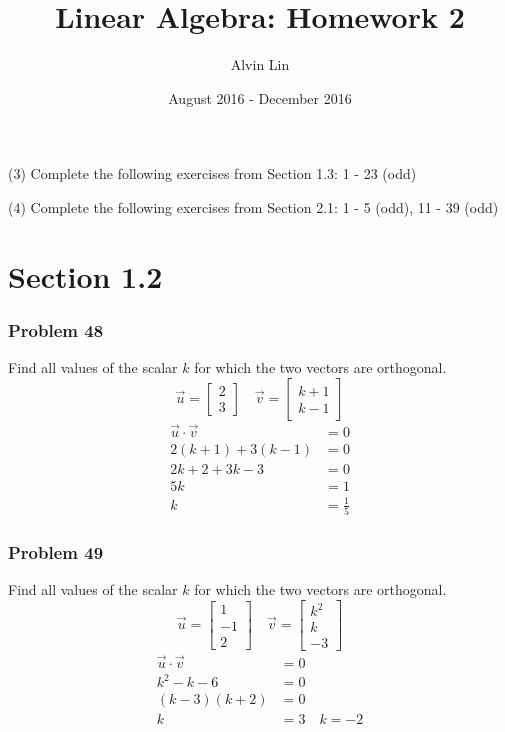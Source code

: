 \documentclass[letterpaper, 12pt]{math}
\title{Linear Algebra: Homework 2}
\author{Alvin Lin}
\date{August 2016 - December 2016}
\begin{document}
\maketitle

(3) Complete the following exercises from Section 1.3: 1 - 23 (odd)

(4) Complete the following exercises from Section 2.1: 1 - 5 (odd), 11 - 39 (odd)

\section*{Section 1.2}

\subsubsection*{Problem 48}
Find all values of the scalar \( k \) for which the two vectors are orthogonal.
\[ \vec{u} = \begin{bmatrix}2 \\ 3\end{bmatrix} \quad
  \vec{v} = \begin{bmatrix}k+1 \\ k-1\end{bmatrix} \]
\begin{align*}
  \vec{u}\cdot\vec{v} &= 0 \\
  2(k+1)+3(k-1) &= 0 \\
  2k+2+3k-3 &= 0 \\
  5k &= 1 \\
  k &= \frac{1}{5}
\end{align*}

\subsubsection*{Problem 49}
Find all values of the scalar \( k \) for which the two vectors are orthogonal.
\[ \vec{u} = \begin{bmatrix}1 \\ -1 \\ 2\end{bmatrix} \quad
  \vec{v} = \begin{bmatrix}k^2 \\ k \\ -3\end{bmatrix} \]
\begin{align*}
  \vec{u}\cdot\vec{v} &= 0 \\
  k^2-k-6 &= 0 \\
  (k-3)(k+2) &= 0 \\
  k &= 3 \quad k = -2
\end{align*}
\end{document}
